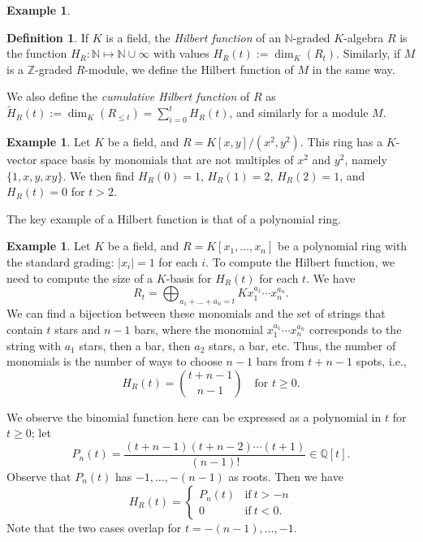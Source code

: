 \documentclass{amsart}[12pt]
\newcommand{\Q}{\mathbb{Q}}
\newcommand{\Z}{\mathbb{Z}}
\newcommand{\N}{\mathbb{N}}
\newcommand{\NN}{\mathbb{N}}
\newcommand{\DEF}[1]{\emph{#1}\index{#1}}
\numberwithin{equation}{section}
\theoremstyle{plain} %
\theoremstyle{definition}
\newtheorem{definition}[equation]{Definition}
\newtheorem{ex}[equation]{Example}
\newtheorem{example}[equation]{Example}
\theoremstyle{remark}
\begin{document}
\begin{ex}
\begin{definition} If $K$ is a field, the \emph{Hilbert function} of an $\NN$-graded $K$-algebra $R$ is the function $H_R:\N \mapsto \N \cup \infty$ with values $H_R(t):=\dim_K(R_t)$. Similarly, if $M$ is a $\Z$-graded $R$-module, we define the Hilbert function of $M$ in the same way.

We also define the \DEF{cumulative Hilbert function} of $R$ as $\widetilde{H}_R(t):=\dim_K(R_{\leq t}) = \sum_{i=0}^t H_R(t)$, and similarly for a module $M$.
\end{definition}

\begin{example}
	Let $K$ be a field, and $R=K[x,y]/(x^2,y^2)$. This ring has a $K$-vector space basis by monomials that are not multiples of $x^2$ and $y^2$, namely $\{1,x,y,xy\}$. We then find $H_R(0)=1$, $H_R(1)=2$, $H_R(2)=1$, and $H_R(t)=0$ for $t>2$.
\end{example}

The key example of a Hilbert function is that of a polynomial ring.



\begin{example}
	Let $K$ be a field, and $R=K[x_1,\dots,x_n]$ be a polynomial ring with the standard grading: $|x_i|=1$ for each $i$. To compute the Hilbert function, we need to compute the size of a $K$-basis for $H_R(t)$ for each $t$. We have
	\[ R_t = \bigoplus_{a_1+\dots+a_n=t} K x_1^{a_1} \cdots x_n^{a_n}.\] We can find a bijection between these monomials and the set of strings that contain $t$ stars and $n-1$ bars, where the monomial $x_1^{a_1} \cdots x_n^{a_n}$ corresponds to the string with $a_1$ stars, then a bar, then $a_2$ stars, a bar, etc. Thus, the number of monomials is the number of ways to choose $n-1$ bars from $t+n-1$ spots, i.e.,
	\[ H_R(t)=\binom{t+n-1}{n-1} \quad\text{for $t\geq 0$.}\]
	

	We observe the binomial function here can be expressed as a polynomial in $t$ for $t\geq 0$; let 
	\[ P_n(t)= \frac{(t+n-1)(t+n-2) \cdots (t+1)}{(n-1)!} \in \Q[t].\]
	Observe that $P_n(t)$ has $-1,\dots,-(n-1)$ as roots. Then we have 
	\[ H_R(t) = \begin{cases} P_n(t) & \text{if} \ t > -n \\ 0 & \text{if} \ t < 0. \end{cases} \]
	Note that the two cases overlap for $t= -(n-1), \dots, -1$.
\end{example}




\end{ex}
\end{document}
